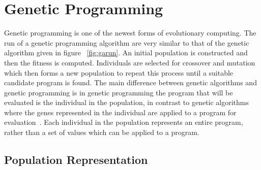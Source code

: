 \documentclass[12pt]{article}
\begin{document}
\section{Genetic Programming}
Genetic programming is one of the newest forms of evolutionary computing. 
The run of a genetic programming algorithm are very similar to that of the genetic algorithm given in figure ~\ref{fig:garun}. An initial
population is constructed and then the fitness is computed. Individuals are selected for crossover and mutation which then forms a new 
population to repeat this process until a suitable candidate program is found.
The main difference between genetic algorithms and genetic programming is in genetic programming
the program that will be evaluated is the individual in the population, in contrast to genetic algorithms where the genes represented in the individual are applied to
a program for evaluation~\cite{whitley94,gpintro98}.
Each individual in the population represents an entire program, rather than a set of values which can be
applied to a program. 

\subsection{Population Representation}
\end{document}
